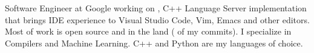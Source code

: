 
\begin{cvparagraph}
  Software Engineer at Google working on
  , C++ Language Server implementation
  that brings IDE experience to Visual Studio Code, Vim, Emacs and other
  editors. Most of work is open source and in the
   land
  (
  of my commits). I specialize in Compilers and Machine Learning. C++ and
  Python are my languages of choice.
\end{cvparagraph}
